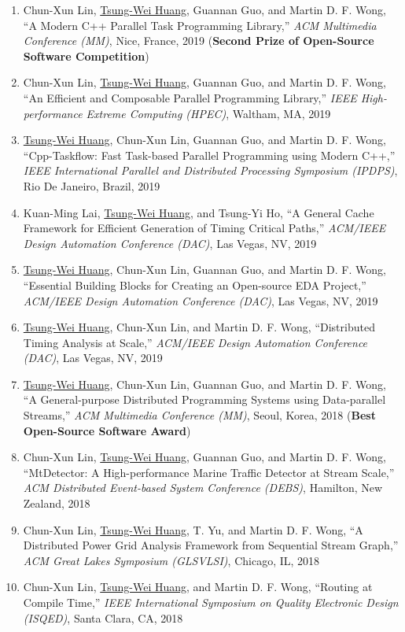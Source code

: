 \documentclass[A4,11pt]{article}
\begin{document}
\begin{enumerate}
    \item Chun-Xun Lin, \underline{Tsung-Wei Huang}, Guannan Guo, and Martin D. F. Wong, ``A Modern C++ Parallel Task Programming Library,'' \textit{ACM Multimedia Conference (MM)}, Nice, France, 2019 (\textbf{Second Prize of Open-Source Software Competition})
    \item Chun-Xun Lin, \underline{Tsung-Wei Huang}, Guannan Guo, and Martin D. F. Wong, ``An Efficient and Composable Parallel Programming Library,'' \textit{IEEE High-performance Extreme Computing (HPEC)}, Waltham, MA, 2019
    \item \underline{Tsung-Wei Huang}, Chun-Xun Lin, Guannan Guo, and Martin D. F. Wong, ``Cpp-Taskflow: Fast Task-based Parallel Programming using Modern C++,'' \textit{IEEE International Parallel and Distributed Processing Symposium (IPDPS)}, Rio De Janeiro, Brazil, 2019
    \item Kuan-Ming Lai, \underline{Tsung-Wei Huang}, and Tsung-Yi Ho, ``A General Cache Framework for Efficient Generation of Timing Critical Paths,'' \textit{ACM/IEEE Design Automation Conference (DAC)}, Las Vegas, NV, 2019
    \item \underline{Tsung-Wei Huang}, Chun-Xun Lin, Guannan Guo, and Martin D. F. Wong, ``Essential Building Blocks for Creating an Open-source EDA Project,'' \textit{ACM/IEEE Design Automation Conference (DAC)}, Las Vegas, NV, 2019
    \item \underline{Tsung-Wei Huang}, Chun-Xun Lin, and Martin D. F. Wong, ``Distributed Timing Analysis at Scale,'' \textit{ACM/IEEE Design Automation Conference (DAC)}, Las Vegas, NV, 2019
    \item \underline{Tsung-Wei Huang}, Chun-Xun Lin, Guannan Guo, and Martin D. F. Wong, ``A General-purpose Distributed Programming Systems using Data-parallel Streams,'' \textit{ACM Multimedia Conference (MM)}, Seoul, Korea, 2018 (\textbf{Best Open-Source Software Award}) 
    \item Chun-Xun Lin, \underline{Tsung-Wei Huang}, Guannan Guo, and Martin D. F. Wong, ``MtDetector: A High-performance Marine Traffic Detector at Stream Scale,'' \textit{ACM Distributed Event-based System Conference (DEBS)}, Hamilton, New Zealand, 2018
    \item Chun-Xun Lin, \underline{Tsung-Wei Huang}, T. Yu, and Martin D. F. Wong, ``A Distributed Power Grid Analysis Framework from Sequential Stream Graph,'' \textit{ACM Great Lakes Symposium (GLSVLSI)}, Chicago, IL, 2018
    \item Chun-Xun Lin, \underline{Tsung-Wei Huang}, and Martin D. F. Wong, ``Routing at Compile Time,'' \textit{IEEE International Symposium on Quality Electronic Design (ISQED)}, Santa Clara, CA, 2018

\end{enumerate}
\end{document}
